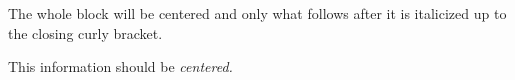 The whole block will be centered and only what follows after it is italicized up to the closing curly bracket.

\centerline{This information should be \it centered.}
